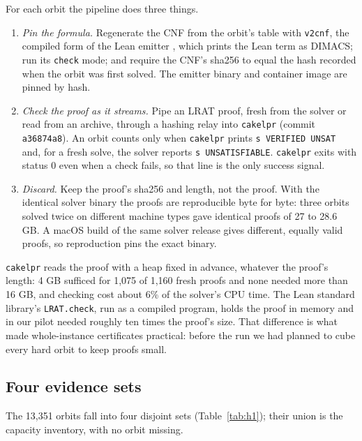 \documentclass{anvil-paper}
\newcommand{\repobase}{https://github.com/rjwalters/lean-genius/blob/erdos85/integration}
\newcommand{\repofile}[2]{\href{\repobase/#1}{\lean{#2}}}
\newcommand{\cakelpr}{\texttt{cake\textunderscore lpr}}
\newcommand{\vtwocnf}{\texttt{v2cnf}}
\newcommand{\lratcheck}{\texttt{LRAT.check}}
\theoremstyle{definition}
\begin{document}
For each orbit the pipeline does three things.
\begin{enumerate}
\item \emph{Pin the formula.} Regenerate the CNF from the orbit's table with \vtwocnf, the compiled form of the Lean emitter \repofile{proofs/Proofs/Erdos85OneHighV2CnfEmit.lean}{Erdos85OneHighV2CnfEmit.lean}, which prints the Lean term  as DIMACS; run its \texttt{check} mode; and require the CNF's sha256 to equal the hash recorded when the orbit was first solved. The emitter binary and container image are pinned by hash.
\item \emph{Check the proof as it streams.} Pipe an LRAT proof, fresh from the solver or read from an archive, through a hashing relay into \cakelpr{} (commit \texttt{a36874a8}). An orbit counts only when \cakelpr{} prints \texttt{s VERIFIED UNSAT} and, for a fresh solve, the solver reports \texttt{s UNSATISFIABLE}. \cakelpr{} exits with status 0 even when a check fails, so that line is the only success signal.
\item \emph{Discard.} Keep the proof's sha256 and length, not the proof. With the identical solver binary the proofs are reproducible byte for byte: three orbits solved twice on different machine types gave identical proofs of 27 to 28.6 GB. A macOS build of the same solver release gives different, equally valid proofs, so reproduction pins the exact binary.
\end{enumerate}
\cakelpr{} reads the proof with a heap fixed in advance, whatever the proof's length: 4 GB sufficed for 1,075 of 1,160 fresh proofs and none needed more than 16 GB, and checking cost about 6\% of the solver's CPU time. The Lean standard library's \lratcheck, run as a compiled program, holds the proof in memory and in our pilot needed roughly ten times the proof's size. That difference is what made whole-instance certificates practical: before the run we had planned to cube every hard orbit to keep proofs small.

\subsection{Four evidence sets}\label{sec:sets}

The 13,351 orbits fall into four disjoint sets (Table~\ref{tab:h1}); their union is the capacity inventory, with no orbit missing.
\end{document}
